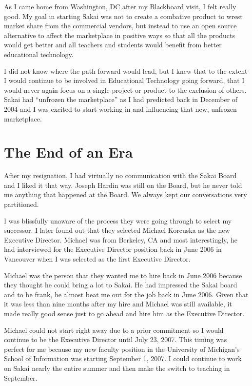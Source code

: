 \documentclass[12pt]{book}
\begin{document}
As I came home from Washington, DC after my Blackboard visit, I felt really good.  My goal
in starting Sakai was not to create a combative product to wrest market share from the
commercial vendors, but instead to use an open source alternative to affect the marketplace
in positive ways so that all the products would get better and all teachers and students
would benefit from better educational technology.

I did not know where the path forward would lead, but I knew that to the extent I would
continue to be involved in Educational Technology going forward, that I would never
again focus on a single project or product to the exclusion of others.
Sakai had ``unfrozen the marketplace'' as I had predicted
back in December of 2004 and I was excited to start working in and influencing that new,
unfrozen marketplace.

\chapter{The End of an Era}

After my resignation, I had virtually no communication with the Sakai Board and I liked
it that way.   Joseph Hardin was still on the Board, but he never told me anything that
happened at the Board.   We always kept our conversations very partitioned.

I was blissfully unaware of the process they were going through to select my successor.
I later found out that they selected Michael Korcuska as the new Executive Director.  Michael
was from Berkeley, CA and most interestingly, he had interviewed for the Executive Director
position back in June 2006 in Vancouver when I was selected as the first Executive Director.

Michael was the person that they wanted me to hire back in June 2006 because they thought he
could bring a lot to Sakai.   He had impressed the Sakai board and to be frank, he almost
beat me out for the job back in June 2006.   Given that it was less than nine months after my
hire and Michael was still available, it made really good sense just to go ahead and hire
him as the Executive Director.

Michael could not start right away due to a prior commitment so I would continue to be
the Executive Director until July 23, 2007.  This timing was perfect for me because my new
faculty position in the University of Michigan's School of Information was starting September 1,
2007.   I could continue to work on Sakai nearly the entire summer and then make the switch to
teaching in September.
\end{document}
